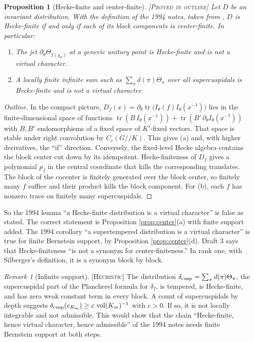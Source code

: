 \documentclass[12pt,letterpaper]{amsart}
\numberwithin{equation}{section}
\newtheorem{proposition}[theorem]{Proposition}
\theoremstyle{definition}
\theoremstyle{remark}
\newtheorem{remark}[theorem]{Remark}
\newcommand{\tr}{\operatorname{tr}}
\newcommand{\vol}{\operatorname{vol}}
\newcommand{\status}[1]{\textup{[\textsc{#1}]}}
\begin{document}
\begin{proposition}[Hecke-finite and center-finite]\label{prop:hecke}
\status{Proved in outline} Let $D$ be an invariant distribution. With the definition of the 1994 notes, taken from \cite[Section 1.10]{Si79}, $D$ is Hecke-finite if and only if each of its block components is center-finite. In particular:
\begin{enumerate}[label=(\alph*),leftmargin=*]
\item The jet $\partial_\theta\Theta_{I(\chi_\theta)}$ at a generic unitary point is Hecke-finite and is not a virtual character.
\item A locally finite infinite sum such as $\sum_\pi d(\pi)\Theta_\pi$ over all supercuspidals is Hecke-finite and is not a virtual character.
\end{enumerate}
\end{proposition}
\begin{proof}[Outline]
In the compact picture, $D_f(x)=\partial_\theta\tr\bigl(I_\theta(f)I_\theta(x^{-1})\bigr)$ lies in the finite-dimensional space of functions $\tr(B\,I_\theta(x^{-1}))+\tr(B'\,\partial_\theta I_\theta(x^{-1}))$ with $B,B'$ endomorphisms of a fixed space of $K'$-fixed vectors. That space is stable under right convolution by $C_c(G/\!/K)$. This gives (a) and, with higher derivatives, the ``if'' direction. Conversely, the fixed-level Hecke algebra contains the block center cut down by its idempotent. Hecke-finiteness of $D_f$ gives a polynomial $p_f$ in the central coordinate that kills the corresponding translates. The block of the cocenter is finitely generated over the block center, so finitely many $f$ suffice and their product kills the block component. For (b), each $f$ has nonzero trace on finitely many supercuspidals.
\end{proof}
So the 1994 lemma ``a Hecke-finite distribution is a virtual character'' is false as stated. The correct statement is Proposition \ref{prop:center}(a) with finite support added. The 1994 corollary ``a supertempered distribution is a virtual character'' is true for finite Bernstein support, by Proposition \ref{prop:center}(d). Draft 3 says that Hecke-finiteness ``is not a synonym for center-finiteness.'' In rank one, with Silberger's definition, it is a synonym block by block.

\begin{remark}[Infinite support]\label{rem:infinite}\status{Heuristic}
The distribution $\delta_{\rm cusp}=\sum_\pi d(\pi)\Theta_\pi$, the supercuspidal part of the Plancherel formula for $\delta_I$, is tempered, is Hecke-finite, and has zero weak constant term in every block. A count of supercuspidals by depth suggests $\delta_{\rm cusp}(e_{K_m})\ge c\,\vol(K_m)^{-1}$ with $c>0$. If so, it is not locally integrable and not admissible. This would show that the chain ``Hecke-finite, hence virtual character, hence admissible'' of the 1994 notes needs finite Bernstein support at both steps.
\end{remark}
\end{document}

